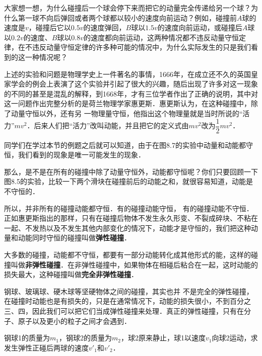 大家想一想，为什么碰撞后一个球会停下来而把它的动量完全传递给另一个球？为什么第一球不向后弹回或者两个球都以较小的速度向前运动？例如，碰撞前$A$球的速度是$v$，碰撞后它以$0.5v$的速度弹回，$B$球以$1.5v$的速度向前运动，或碰撞后$A$球以$0.2v$的速度、$B$球以$0.8v$的速度都向前运动，这两种情况都不违反动量守恒定律，在不违反动量守恒定律的许多种可能的情况中，为什么实际发生的只是我们看到的这一种情况呢？

上述的实验和问题是物理学史上一件著名的事情，1666年，在成立还不久的英国皇家学会的例会上表演了这个实验并引起了很大的兴趣，随后出现了许多对这一现象的不同的甚至是混乱的解释，到1668年，才有三位学者作出了正确的说明，其中对这一问题作出完整分析的是荷兰物理学家惠更斯．惠更斯认为，在这种碰撞中，除了动量守恒以外，还有另
一物理量守恒，他指出这个物理量就是当时所说的“活力”$mv^2$．后来人们把“活力”改叫动能，并且把它的定义式由$mv^2$改为$\dfrac{1}{2}mv^2$．

同学们在学过本节的例题之后就可以知道，由于在图8.7的实验中动量和动能都守恒，我们看到的现象是唯一可能发生的现象．

那么，是不是在所有的碰撞中除了动量守恒外，动能都守恒呢？你们只要回顾一下图8.5的实验，比较一下两个滑块在碰撞前后的动能之和，就很容易知道，动能是不守恒的．

所以，并非所有的碰撞动能都守恒．有的碰撞动能守恒，
有的碰撞动能不守恒．正如惠更斯指出的那样，只有在碰撞后物体不发生永久形变、不裂成碎块、不粘在一起、不发热以及不发生其他内部变化的情况下，动能才是守恒的，我们把这种动量和动能同时守恒的碰撞叫做\textbf{弹性碰撞}．

大多数的碰撞，动能都不守恒，都要有一部分动能转化成其他形式的能，这样的碰撞叫做\textbf{非弹性碰撞}．在非弹性碰撞中，如果物体在相碰后粘合在一起，这时动能的损失最大，这种碰撞叫做\textbf{完全非弹性碰撞}．

钢球、玻璃球、硬木球等坚硬物体之间的碰撞，其实也并
不是完全的弹性碰撞，在碰撞时动能也是有损失的，只是在通常情况下，动能的损失很小，不到百分之三、四，因此我们可以把它们当成弹性碰撞来处理．真正的弹性碰撞，只有在分子、原子以及更小的粒子之间才会遇到．


\begin{example}
    钢球1的质量为$m_1$，钢球2的质量为$m_2$，球2原来静止，球1以速度$v_1$向球2运动，求发生弹性正碰后两球的速度$v'_1$和$v'_2$．
\end{example}



